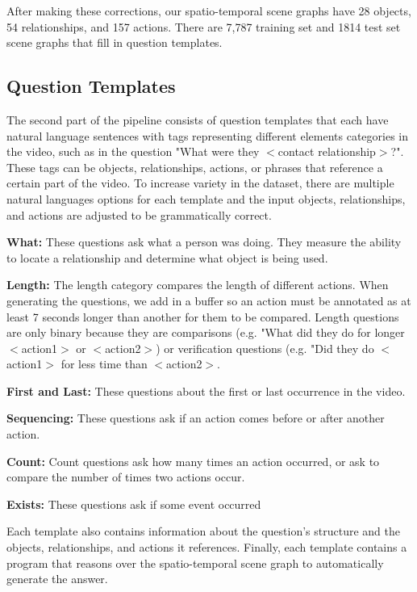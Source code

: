 After making these corrections, our spatio-temporal scene graphs have 28 objects, 54 relationships, and 157 actions. There are 7,787 training set and 1814 test set scene graphs that fill in question templates.

\subsection{Question Templates}

The second part of the pipeline consists of question templates that each have natural language sentences with tags representing different elements categories in the video, such as in the question "What were they $<$contact relationship$>$?". These tags can be objects, relationships, actions, or phrases that reference a certain part of the video. To increase variety in the dataset, there are multiple natural languages options for each template and the input objects, relationships, and actions are adjusted to be grammatically correct.

\textbf{What: } These questions ask what a person was doing. They measure the ability to locate a relationship and determine what object is being used. 

\textbf{Length: } The length category compares the length of different actions. When generating the questions, we add in a buffer so an action must be annotated as at least 7 seconds longer than another for them to be compared. Length questions are only binary because they are comparisons (e.g. "What did they do for longer $<$action1$>$ or $<$action2$>$) or verification questions (e.g. "Did they do $<$action1$>$ for less time than $<$action2$>$.

\textbf{First and Last: } These questions about the first or last occurrence in the video. 


\textbf{Sequencing: } These questions ask if an action comes before or after another action.

\textbf{Count: } Count questions ask how many times an action occurred, or ask to compare the number of times two actions occur.

\textbf{Exists: } These questions ask if some event occurred



Each template also contains information about the question's structure and the objects, relationships, and actions it references. Finally, each template contains a program that reasons over the spatio-temporal scene graph to automatically generate the answer.

